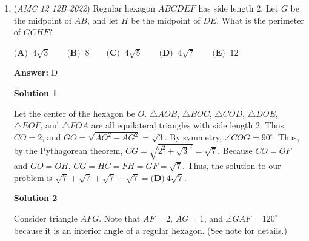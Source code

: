 \begin{enumerate}
 $\textbf{(A) }\ 8 \qquad \textbf{(B) }\ 12 \qquad \textbf{(C) }\ 16 \qquad \textbf{(D) }\ 17 \qquad \textbf{(E) }\ 22$

 \textbf{Answer: }B



\textbf{Solution 1}

We can rewrite the given equation as $2^{a_7-27}=a_7$. Hence, $a_7$ must be a power of $2$ and larger than $27$. The first power of 2 that is larger than $27$, namely $32$, does satisfy the equation: $2^{32 - 27} = 2^5 = 32$. In fact, this is the only solution; $2^{a_7-27}$ is exponential whereas $a_7$ is linear, so their graphs will not intersect again.

 Now, let the common difference in the sequence be $d$. Hence, $a_0 = 32 - 7d$ and $a_2 = 32 - 5d$. To minimize $a_2$, we maxmimize $d$. Since the sequence contains only positive integers, $32 - 7d > 0$ and hence $d \leq 4$. When $d = 4$, $a_2 = \boxed{\textbf{(B)}\ 12}$.

 


 


	\item (\textit{AMC 12 12B 2022}) Regular hexagon $ABCDEF$ has side length $2$. Let $G$ be the midpoint of $\overline{AB}$, and let $H$ be the midpoint of $\overline{DE}$. What is the perimeter of $GCHF$?


 $\textbf{(A) }\ 4\sqrt3 \qquad \textbf{(B) }\ 8 \qquad \textbf{(C) }\ 4\sqrt5 \qquad \textbf{(D) }\ 4\sqrt7 \qquad \textbf{(E) }\ 12$

 \textbf{Answer: }D



\textbf{Solution 1}

Let the center of the hexagon be $O$. $\triangle AOB$, $\triangle BOC$, $\triangle COD$, $\triangle DOE$, $\triangle EOF$, and $\triangle FOA$ are all equilateral triangles with side length $2$. Thus, $CO = 2$, and $GO = \sqrt{AO^2 - AG^2} = \sqrt{3}$. By symmetry, $\angle COG = 90^{\circ}$. Thus, by the Pythagorean theorem, $CG = \sqrt{2^2 + \sqrt{3}^2} = \sqrt{7}$. Because $CO = OF$ and $GO = OH$, $CG = HC = FH = GF = \sqrt{7}$. Thus, the solution to our problem is $\sqrt{7} + \sqrt{7} + \sqrt{7} + \sqrt{7} = \boxed{\textbf{(D)}\ 4\sqrt7}$.

 



\textbf{Solution 2}

Consider triangle $AFG$. Note that $AF = 2$, $AG = 1$, and $\angle GAF = 120 ^{\circ}$ because it is an interior angle of a regular hexagon. (See note for details.) 


\end{enumerate}

